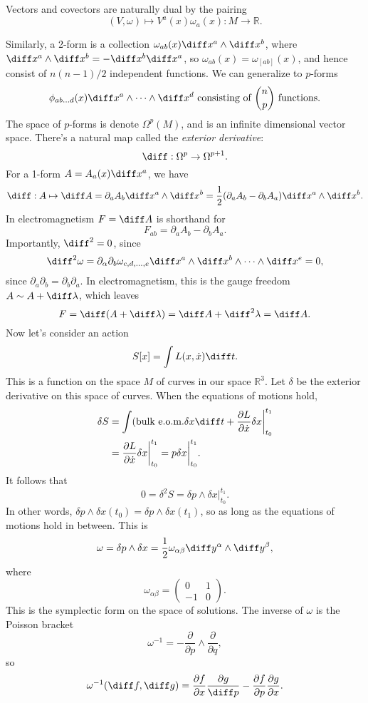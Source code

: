 \documentclass[12pt]{article}
\begin{document}
Vectors and covectors are naturally dual by the pairing
\[
	(V, \omega) \mapsto V^a(x) \omega_a(x) : M \to \mathbb{R}.
\]

Similarly, a 2-form is a collection $\omega_{ab}(x) \diff x^a \wedge \diff x^b$, where $\diff x^a \wedge \diff x^b = - \diff x^b \diff x^a$, so $\omega_{ab}(x) = \omega_{[ab]}(x)$, and hence consist of $n(n-1)/2$ independent functions. We can generalize to $p$-forms
\[
	\phi_{ab\dots d}(x) \diff x^a \wedge \cdots \wedge \diff x^d \text{ consisting of } \binom{n}{p} \text{ functions}.
\]
The space of $p$-forms is denote $\Omega^p(M)$, and is an infinite dimensional vector space. There's a natural map called the \emph{exterior derivative}:
\[
\diff : \Omega^{p} \to \Omega^{p+1}.
\]
For a 1-form $A = A_a(x) \diff x^a$, we have
\[
\diff : A \mapsto \diff A = \partial_a A_b \diff x^a \wedge \diff x^b = \frac{1}{2}(\partial_a A_b - \partial_b A_a) \diff x^a \wedge \diff x^b.
\]
In electromagnetism $F = \diff A$ is shorthand for
\[
F_{ab} = \partial_a A_b - \partial_b A_a.
\]
Importantly, $\diff^2 = 0$, since
\[
\diff^2\omega = \partial_\alpha \partial_b \omega_{c,d,\ldots, e} \diff x^a \wedge \diff x^b \wedge \cdots \wedge \diff x^e = 0,
\]
since $\partial_a \partial_b = \partial_b \partial_a$. In electromagnetism, this is the gauge freedom $A \sim A + \diff \lambda$, which leaves
\[
F = \diff(A + \diff \lambda) = \diff A + \diff^2\lambda = \diff A.
\]
Now let's consider an action
\[
	S[x] = \int L(x, \dot x) \diff t.
\]
This is a function on the space $M$ of curves in our space $\mathbb{R}^3$. Let $\delta$ be the exterior derivative on this space of curves. When the equations of motions hold,
\begin{align*}
	\delta S &= \int (\text{bulk e.o.m.} \delta x \diff t + \frac{\partial L}{\partial \dot x} \delta x \biggr|_{t_0}^{t_1} \\
		 &= \frac{\partial L}{\partial \dot x} \delta x \biggr|_{t_0}^{t_1} = p \delta x \biggr|_{t_0}^{t_1}.
\end{align*}
It follows that
\[
0 = \delta^2 S = \delta p \wedge \delta x \biggr|_{t_0}^{t_1}.
\]
In other words, $\delta p \wedge \delta x (t_0) = \delta p \wedge \delta x (t_1)$, so as long as the equations of motions hold in between. This is
\[
	\omega = \delta p \wedge \delta x = \frac{1}{2} \omega_{\alpha \beta} \diff y^{\alpha} \wedge \diff y^{\beta},
\]
where
\[
\omega_{\alpha\beta} =
\begin{pmatrix}
	0&1\\-1&0
\end{pmatrix}.
\]
This is the symplectic form on the space of solutions. The inverse of $\omega$ is the Poisson bracket
\[
\omega^{-1} = - \frac{\partial}{\partial p} \wedge \frac{\partial}{\partial q},
\]
so
\[
\omega^{-1}(\diff f, \diff g) = \frac{\partial f}{\partial x} \frac{\partial g}{\diff p} - \frac{\partial f}{\partial p} \frac{\partial g}{\partial x}.
\]
\end{document}
